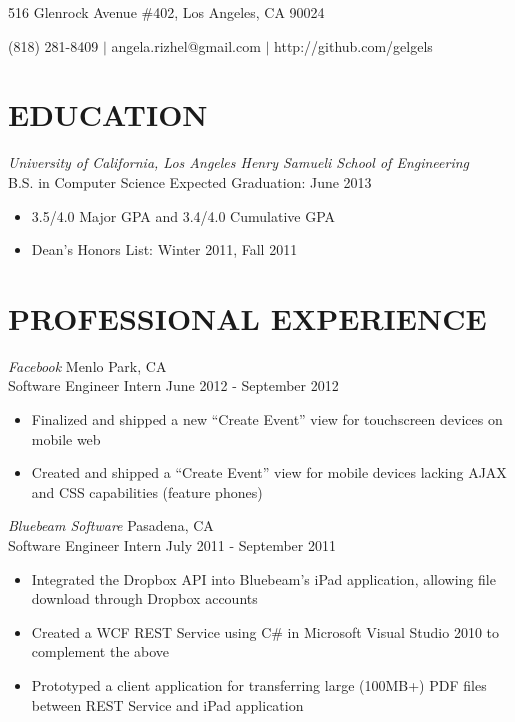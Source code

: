 \documentclass{res}
\begin{document}

\begin{resume}
\centerline{516 Glenrock Avenue \#402, Los Angeles, CA 90024}
\centerline{(818) 281-8409 $|$ angela.rizhel@gmail.com $|$ http://github.com/gelgels }

\section{EDUCATION}
\vspace{8pt}
{\sl{University of California}, Los Angeles \hfill Henry Samueli School of Engineering} \\
B.S. in Computer Science \hfill Expected Graduation: June 2013

\begin{itemize} \itemsep -2pt %
  \item 3.5/4.0 Major GPA and 3.4/4.0 Cumulative GPA
  \item Dean's Honors List: Winter 2011, Fall 2011
\end{itemize} \vspace{-6pt}

\section{PROFESSIONAL EXPERIENCE}
\vspace{6pt}
  {\sl Facebook} \hfill Menlo Park, CA \\
  Software Engineer Intern \hfill June 2012 - September 2012

   \begin{itemize} \itemsep -2pt %
     \item Finalized and shipped a new ``Create Event'' view for touchscreen devices on mobile web
     \item Created and shipped a ``Create Event'' view for mobile devices lacking AJAX and CSS capabilities (feature phones)
   \end{itemize} \vspace{-6pt}

 {\sl Bluebeam Software} \hfill Pasadena, CA \\
 Software Engineer Intern \hfill July 2011 - September 2011

   \begin{itemize} \itemsep -2pt
   \item Integrated the Dropbox API into Bluebeam's iPad application, allowing file download through Dropbox accounts
   \item Created a WCF REST Service using C\# in Microsoft Visual Studio 2010 to complement the above
   \item Prototyped a client application for transferring large (100MB+) PDF files between  REST Service and iPad application
   \end{itemize} \vspace{-12pt}


\end{resume}
\end{document}
